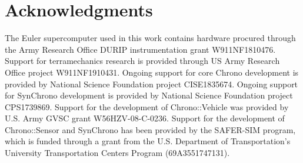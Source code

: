 \documentclass[12pt,twocolumn]{article}
\newcommand{\chrono}{Chrono}
\newcommand{\chronomod}[1]{\chrono{}::#1}
\newcommand{\synchrono}{Syn\chrono{}}
\begin{document}

\section*{Acknowledgments}
The Euler supercomputer used in this work contains hardware procured through the Army Research Office DURIP instrumentation grant W911NF1810476. Support for terramechanics research is provided through US Army Research Office project W911NF1910431. Ongoing support for core {\chrono} development is provided by National Science Foundation project CISE1835674. Ongoing support for SynChrono development is provided by National Science Foundation project CPS1739869. Support for the development of \chronomod{Vehicle} was provided by U.S. Army GVSC grant W56HZV-08-C-0236. Support for the development of \chronomod{Sensor} and {\synchrono} has been provided by the SAFER-SIM program, which is funded through a grant from the U.S. Department of Transportation's University Transportation Centers Program (69A3551747131).







%
\end{document}
